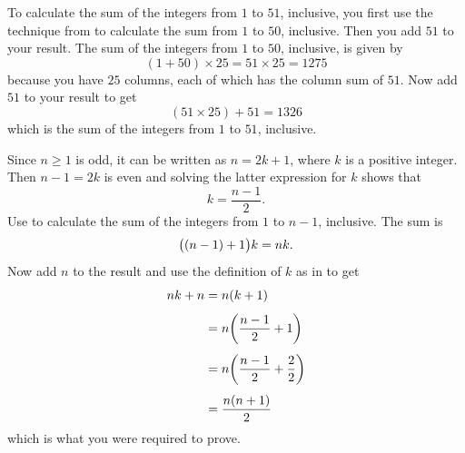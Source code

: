 \documentclass[a4paper,oneside,12pt]{article}
\begin{document}
\begin{problem}
{\begin{solution}
To calculate the sum of the integers from $1$ to $51$, inclusive, you
first use the technique from
 to calculate the sum
from $1$ to $50$, inclusive.  Then you add $51$ to your result.  The
sum of the integers from $1$ to $50$, inclusive, is given by
\[
(1 + 50) \times 25
=
51 \times 25
=
1275
\]
because you have $25$ columns, each of which has the column sum of
$51$.  Now add $51$ to your result to get
\[
(51 \times 25) + 51
=
1326
\]
which is the sum of the integers from $1$ to $51$, inclusive.

Since $n \geq 1$ is odd, it can be written as $n = 2k + 1$, where $k$
is a positive integer.  Then $n - 1 = 2k$ is even and solving the
latter expression for $k$ shows that
\begin{equation}
\label{eqn:n_odd_define_k}
k
=
\frac{n - 1}{2}.
\end{equation}
Use
to calculate the sum of the integers from $1$ to $n - 1$, inclusive.
The sum is
\[
\big((n - 1) + 1\big)k
=
nk.
\]
Now add $n$ to the result and use the definition of $k$ as in
 to get
\begin{align*}
nk + n
&=
n(k + 1) \\[4pt]
&=
n
\parenthesis*{
  \frac{n-1}{2}
  +
  1
} \\[4pt]
&=
n
\parenthesis*{
  \frac{n-1}{2}
  +
  \frac{2}{2}
} \\[4pt]
&=
\frac{n(n + 1)}{2}
\end{align*}
which is what you were required to prove.
\end{solution}
}{}


\end{problem}
\end{document}
